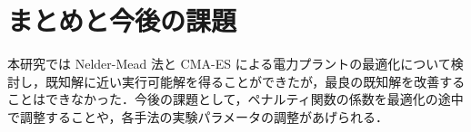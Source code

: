 \documentclass[twocolumn]{jarticle}
\begin{document}
\section{まとめと今後の課題}
本研究では Nelder-Mead 法と CMA-ES による電力プラントの最適化について検討し，既知解に近い実行可能解を得ることができたが，最良の既知解を改善することはできなかった．今後の課題として，ペナルティ関数の係数を最適化の途中で調整することや，各手法の実験パラメータの調整があげられる．


\end{document}
